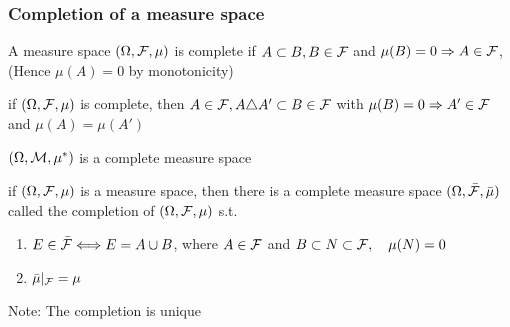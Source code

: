 \subsubsection*{Completion of a measure space}
\begin{dfn}
A measure space $(\Omega, \mathcal{F}, \mu)$ is complete if $A\subset B, B\in \mathcal{F}$ and $\mu(B) = 0 \Rightarrow A\in \mathcal{F}$, (Hence $\mu(A) = 0$ by monotonicity)
\end{dfn}
\begin{ex} if $(\Omega, \mathcal{F}, \mu)$ is complete, then $A\in \mathcal{F}, A\triangle A' \subset B\in \mathcal{F}$ with $\mu(B) = 0 \Rightarrow A'\in \mathcal{F} $ and $\mu(A) = \mu(A')$ 
\end{ex}
\vspace{5cm}
\begin{example}
$(\Omega, \mathcal{M}, \mu^*)$ is a complete measure space
\end{example}
\vspace{10cm}
\begin{thm}
if $(\Omega, \mathcal{F}, \mu)$ is a measure space, then there is a complete measure space $(\Omega, \bar{\mathcal{F}}, \bar{\mu})$ called the completion of $(\Omega, \mathcal{F}, \mu)$ s.t.
\begin{enumerate}
    \item $E\in \bar{\mathcal{F}} \Longleftrightarrow E = A \cup B$, where $A\in \mathcal{F}$ and $B \subset N \subset \mathcal{F}, \quad \mu(N) = 0$
    \item $\bar{\mu}|_{\mathcal{F}} = \mu$
\end{enumerate}
\end{thm}
Note: The completion is unique